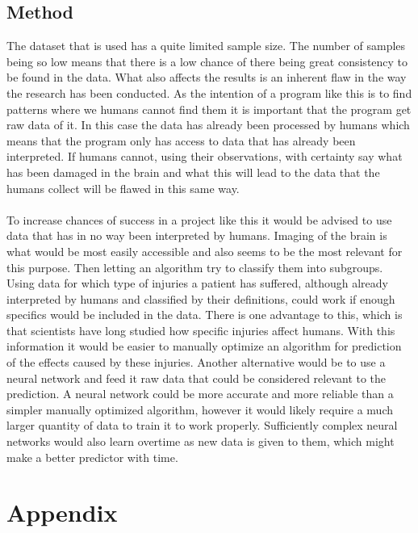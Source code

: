 \documentclass[11pt]{article}
\begin{document}
\subsection{Method}
The dataset that is used has a quite limited sample size. The number of samples being so low means that there is a low chance of there being great consistency to be found in the data. What also affects the results is an inherent flaw in the way the research has been conducted. As the intention of a program like this is to find patterns where we humans cannot find them it is important that the program get raw data of it. In this case the data has already been processed by humans which means that the program only has access to data that has already been interpreted. If humans cannot, using their observations, with certainty say what has been damaged in the brain and what this will lead to the data that the humans collect will be flawed in this same way.\\
\\
To increase chances of success in a project like this it would be advised to use data that has in no way been interpreted by humans. Imaging of the brain is what would be most easily accessible and also seems to be the most relevant for this purpose. Then letting an  algorithm try to classify them into subgroups. Using data for which type of injuries a patient has suffered, although already interpreted by humans and classified by their definitions, could work if enough specifics would be included in the data. There is one advantage to this, which is that scientists have long studied how specific injuries affect humans. With this information it would be easier to manually optimize an algorithm for prediction of the effects caused by these injuries. Another alternative would be to use a neural network and feed it raw data that could be considered relevant to the prediction. A neural network could be more accurate and more reliable than a simpler manually optimized algorithm, however it would likely require a much larger quantity of data to train it to work properly. Sufficiently complex neural networks would also learn overtime as new data is given to them, which might make a better predictor with time.
\clearpage

\printglossary
\printglossary[type=\acronymtype]


\printbibliography
\clearpage

\section*{Appendix}
\end{document}
